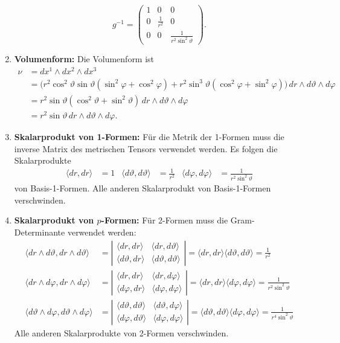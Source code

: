 \begin{enumerate}
\[
g^{-1}
=
\begin{pmatrix}
1 & 0 & 0 \\
0 & \frac1{r^2} & 0 \\
0 & 0 & \frac{1}{r^2\sin^2\vartheta}
\end{pmatrix}.
\]
\item {\bf Volumenform:}
Die Volumenform ist
\begin{align*}
\nu
&=
dx^1\wedge dx^2 \wedge dx^3
\\
&=
\bigl(
r^2 \cos^2\vartheta \sin\vartheta (\sin^2\varphi+\cos^2\varphi)
+
r^2 \sin^3\vartheta (\cos^2\varphi +\sin^2\varphi)
\bigr)\,
dr\wedge d\vartheta \wedge d\varphi
\\
&=
r^2 \sin\vartheta
(
\cos^2\vartheta
+
\sin^2\vartheta
)
\,dr\wedge d\vartheta \wedge d\varphi
\\
&=
r^2 \sin\vartheta\, dr\wedge d\vartheta\wedge d\varphi.
\end{align*}
\item {\bf Skalarprodukt von 1-Formen:}
Für die Metrik der 1-Formen muss die inverse Matrix
des metrischen Tensors verwendet werden.
Es folgen die Skalarprodukte
\begin{align*}
\langle dr,dr\rangle &= 1
&
\langle d\vartheta,d\vartheta\rangle &= \frac{1}{r^2}
&
\langle d\varphi,d\varphi\rangle &= \frac{1}{r^2\sin^2\vartheta}
\end{align*}
von Basis-1-Formen.
Alle anderen Skalarprodukt von Basis-1-Formen verschwinden.

\item {\bf Skalarprodukt von $p$-Formen:}
Für 2-Formen muss die Gram-Determinante verwendet werden:
\begin{align*}
\langle dr\wedge d\vartheta , dr\wedge d\vartheta \rangle
&=
\left|\begin{matrix}
\langle dr, dr \rangle        & \langle dr,d\vartheta \rangle \\
\langle d\vartheta,dr \rangle & \langle d\vartheta, d\vartheta \rangle
\end{matrix}\right|
=
\langle dr, dr \rangle \langle d\vartheta, d\vartheta \rangle
=
\frac1{r^2}
\\
\langle dr\wedge d\varphi , dr\wedge d\varphi \rangle
&=
\left|\begin{matrix}
\langle dr, dr \rangle      & \langle dr,d\varphi \rangle \\
\langle d\varphi,dr \rangle & \langle d\varphi, d\varphi \rangle
\end{matrix}\right|
=
\langle dr, dr \rangle \langle d\varphi, d\varphi \rangle
=
\frac1{r^2\sin^2\vartheta}
\\
\langle d\vartheta\wedge d\varphi , d\vartheta\wedge d\varphi \rangle
&=
\left|\begin{matrix}
\langle d\vartheta, d\vartheta \rangle
	& \langle d\vartheta,d\varphi \rangle \\
\langle d\varphi,d\vartheta \rangle
	& \langle d\varphi, d\varphi \rangle
\end{matrix}\right|
=
\langle d\vartheta, d\vartheta \rangle \langle d\varphi, d\varphi \rangle
=
\frac1{r^4\sin^2\vartheta}
\end{align*}
Alle anderen Skalarprodukte von 2-Formen verschwinden.


\end{enumerate}
